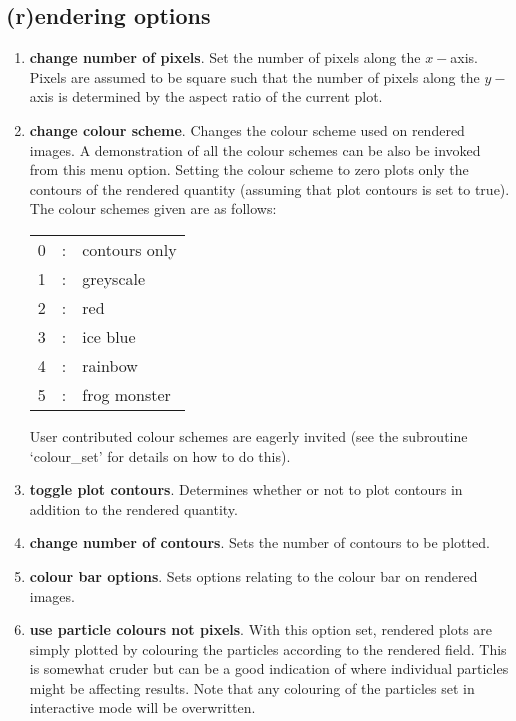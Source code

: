 \documentclass[a4paper,12pt]{article}
\begin{document}
\subsection{(r)endering options}
\begin{enumerate}
\item \textbf{change number of pixels}. Set the number of pixels along the
$x-$axis. Pixels are assumed to be square such that the number of pixels along
the $y-$axis is determined by the aspect ratio of the current plot.
\item \textbf{change colour scheme}. Changes the colour scheme used on rendered
images. A demonstration of all the colour schemes can be also be invoked from
this menu option. Setting the colour scheme to zero plots only the contours of
the rendered quantity (assuming that plot contours is set to true). The colour
schemes given are as follows:

\begin{tabular}{rcp{}}
  0 & : & contours only \\
  1 & : & greyscale \\
  2 & : & red \\
  3 & : & ice blue \\
  4 & : & rainbow \\
  5 & : & frog monster
\end{tabular}

User contributed colour schemes are eagerly invited (see the subroutine
`colour\_set' for details on how to do this).

\item \textbf{toggle plot contours}. Determines whether or not to plot contours
in addition to the rendered quantity.
\item \textbf{change number of contours}. Sets the number of contours to be
plotted. 
\item \textbf{colour bar options}. Sets options relating to the colour
bar on rendered images.
\item \textbf{use particle colours not pixels}. With this option set, rendered plots are
simply plotted by colouring the particles according to the rendered field. This is somewhat
cruder but can be a good indication of where individual particles might be affecting results.
Note that any colouring of the particles set in interactive mode will be overwritten.
\end{enumerate}
\end{document}
